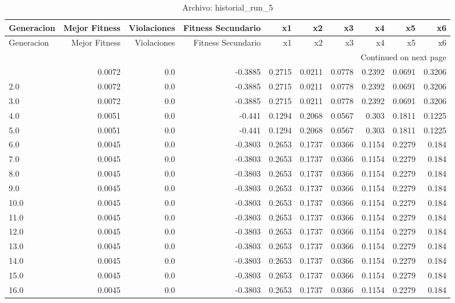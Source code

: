 \begin{longtable}{lrrrrrrrrr}
\caption{Archivo: historial\_run\_5}\label{tab:historial_run_5} \\
\toprule
Generacion & Mejor Fitness & Violaciones & Fitness Secundario & x1 & x2 & x3 & x4 & x5 & x6 \\
\midrule
\endfirsthead
\toprule
Generacion & Mejor Fitness & Violaciones & Fitness Secundario & x1 & x2 & x3 & x4 & x5 & x6 \\
\midrule
\endhead
\midrule
\multicolumn{10}{r}{Continued on next page} \\
\midrule
\endfoot
\bottomrule
\endlastfoot
1.0 & 0.0072 & 0.0 & -0.3885 & 0.2715 & 0.0211 & 0.0778 & 0.2392 & 0.0691 & 0.3206 \\
2.0 & 0.0072 & 0.0 & -0.3885 & 0.2715 & 0.0211 & 0.0778 & 0.2392 & 0.0691 & 0.3206 \\
3.0 & 0.0072 & 0.0 & -0.3885 & 0.2715 & 0.0211 & 0.0778 & 0.2392 & 0.0691 & 0.3206 \\
4.0 & 0.0051 & 0.0 & -0.441 & 0.1294 & 0.2068 & 0.0567 & 0.303 & 0.1811 & 0.1225 \\
5.0 & 0.0051 & 0.0 & -0.441 & 0.1294 & 0.2068 & 0.0567 & 0.303 & 0.1811 & 0.1225 \\
6.0 & 0.0045 & 0.0 & -0.3803 & 0.2653 & 0.1737 & 0.0366 & 0.1154 & 0.2279 & 0.184 \\
7.0 & 0.0045 & 0.0 & -0.3803 & 0.2653 & 0.1737 & 0.0366 & 0.1154 & 0.2279 & 0.184 \\
8.0 & 0.0045 & 0.0 & -0.3803 & 0.2653 & 0.1737 & 0.0366 & 0.1154 & 0.2279 & 0.184 \\
9.0 & 0.0045 & 0.0 & -0.3803 & 0.2653 & 0.1737 & 0.0366 & 0.1154 & 0.2279 & 0.184 \\
10.0 & 0.0045 & 0.0 & -0.3803 & 0.2653 & 0.1737 & 0.0366 & 0.1154 & 0.2279 & 0.184 \\
11.0 & 0.0045 & 0.0 & -0.3803 & 0.2653 & 0.1737 & 0.0366 & 0.1154 & 0.2279 & 0.184 \\
12.0 & 0.0045 & 0.0 & -0.3803 & 0.2653 & 0.1737 & 0.0366 & 0.1154 & 0.2279 & 0.184 \\
13.0 & 0.0045 & 0.0 & -0.3803 & 0.2653 & 0.1737 & 0.0366 & 0.1154 & 0.2279 & 0.184 \\
14.0 & 0.0045 & 0.0 & -0.3803 & 0.2653 & 0.1737 & 0.0366 & 0.1154 & 0.2279 & 0.184 \\
15.0 & 0.0045 & 0.0 & -0.3803 & 0.2653 & 0.1737 & 0.0366 & 0.1154 & 0.2279 & 0.184 \\
16.0 & 0.0045 & 0.0 & -0.3803 & 0.2653 & 0.1737 & 0.0366 & 0.1154 & 0.2279 & 0.184 \\

\end{longtable}
